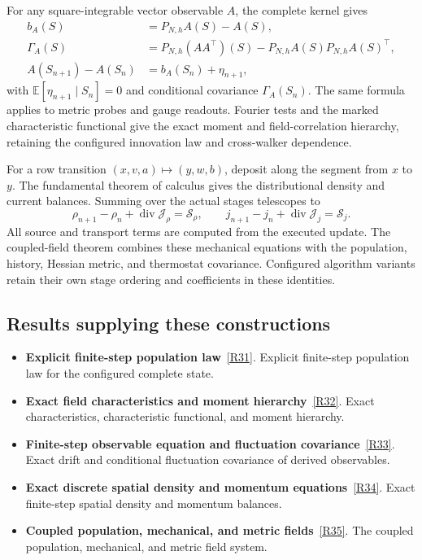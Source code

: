 \documentclass[11pt,a4paper]{article}
\begin{document}
For any square-integrable vector observable \(A\), the complete kernel gives
\begin{align*}
b_A(S)&=P_{N,h}A(S)-A(S),\\
\Gamma_A(S)&=P_{N,h}(AA^\top)(S)-P_{N,h}A(S)P_{N,h}A(S)^\top,\\
A(S_{n+1})-A(S_n)&=b_A(S_n)+\eta_{n+1},
\end{align*}
with \(\mathbb E[\eta_{n+1}\mid S_n]=0\) and conditional covariance \(\Gamma_A(S_n)\). The same formula applies to metric probes and gauge readouts. Fourier tests and the marked characteristic functional give the exact moment and field-correlation hierarchy, retaining the configured innovation law and cross-walker dependence.

For a row transition \((x,v,a)\mapsto(y,w,b)\), deposit along the segment from \(x\) to \(y\). The fundamental theorem of calculus gives the distributional density and current balances. Summing over the actual stages telescopes to
\[
\rho_{n+1}-\rho_n+\operatorname{div}\mathcal J_\rho=\mathcal S_\rho,
\qquad
j_{n+1}-j_n+\operatorname{div}\mathcal J_j=\mathcal S_j.
\]
All source and transport terms are computed from the executed update. The coupled-field theorem combines these mechanical equations with the population, history, Hessian metric, and thermostat covariance. Configured algorithm variants retain their own stage ordering and coefficients in these identities.
\subsection*{Results supplying these constructions}
\begin{itemize}
\item \textbf{Explicit finite-step population law}~\hyperref[src:thm-algorithmic-explicit-transition]{[R31]}. Explicit finite-step population law for the configured complete state.
\item \textbf{Exact field characteristics and moment hierarchy}~\hyperref[src:thm-algorithmic-field-characteristics]{[R32]}. Exact characteristics, characteristic functional, and moment hierarchy.
\item \textbf{Finite-step observable equation and fluctuation covariance}~\hyperref[src:thm-algorithmic-observable-increment]{[R33]}. Exact drift and conditional fluctuation covariance of derived observables.
\item \textbf{Exact discrete spatial density and momentum equations}~\hyperref[src:thm-algorithmic-spatial-field-equations]{[R34]}. Exact finite-step spatial density and momentum balances.
\item \textbf{Coupled population, mechanical, and metric fields}~\hyperref[src:thm-algorithmic-coupled-field-system]{[R35]}. The coupled population, mechanical, and metric field system.
\end{itemize}
\end{document}
